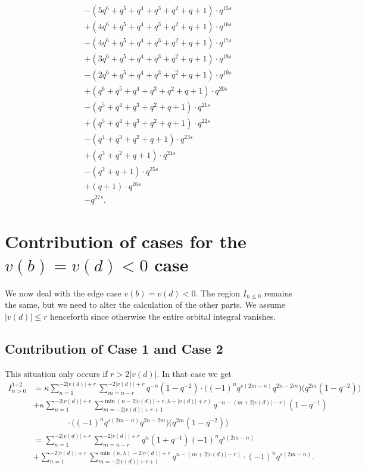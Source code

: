 \begin{example}
\begin{align*}
    &- (5q^6 + q^5 + q^4 + q^3 + q^2 + q + 1) \cdot q^{15s} \\
    &+ (4q^6 + q^5 + q^4 + q^3 + q^2 + q + 1) \cdot q^{16s} \\
    &- (4q^6 + q^5 + q^4 + q^3 + q^2 + q + 1) \cdot q^{17s} \\
    &+ (3q^6 + q^5 + q^4 + q^3 + q^2 + q + 1) \cdot q^{18s} \\
    &- (2q^6 + q^5 + q^4 + q^3 + q^2 + q + 1) \cdot q^{19s} \\
    &+ (q^6 + q^5 + q^4 + q^3 + q^2 + q + 1) \cdot q^{20s} \\
    &- (q^5 + q^4 + q^3 + q^2 + q + 1) \cdot q^{21s} \\
    &+ (q^5 + q^4 + q^3 + q^2 + q + 1) \cdot q^{22s} \\
    &- (q^4 + q^3 + q^2 + q + 1) \cdot q^{23s} \\
    &+ (q^3 + q^2 + q + 1) \cdot q^{24s} \\
    &- (q^2 + q + 1) \cdot q^{25s} \\
    &+ (q + 1) \cdot q^{26s} \\
    &- q^{27s}.
  \end{align*}
\end{example}

\section{Contribution of cases for the $v(b) = v(d) < 0$ case}
We now deal with the edge case $v(b) = v(d) < 0$.
The region $I_{n \le 0}$ remains the same, but we need to alter the calculation of the other parts.
We assume $|v(d)| \le r$ henceforth since otherwise the entire orbital integral vanishes.

\subsection{Contribution of Case 1 and Case 2}
This situation only occurs if $r > 2|v(d)|$.
In that case we get
\begin{align*}
  I_{n > 0}^{\text{1+2}}
  &= \kappa \sum_{n=1}^{-2|v(d)|+r}
    \sum_{m=n-r}^{-2|v(d)|+r}
    q^{-n} \left( 1 - q^{-2} \right)
    \cdot \Big( (-1)^n q^{s(2m-n)} q^{2n-2m} \Big) \Big( q^{2m}(1-q^{-2}) \Big) \\
  &+ \kappa \sum_{n=1}^{-2|v(d)|+r}
    \sum_{m=-2|v(d)|+r+1}^{\min\left(n-2|v(d)|+r, \lambda-|v(d)|+r\right)}
    q^{-n - (m+2|v(d)|-r)} \left( 1 - q^{-1} \right) \\
  &\qquad\qquad\cdot \Big( (-1)^n q^{s(2m-n)} q^{2n-2m} \Big) \Big( q^{2m}(1-q^{-2}) \Big) \\
  &= \sum_{n=1}^{-2|v(d)|+r} \sum_{m=n-r}^{-2|v(d)|+r}
    q^{n} \left( 1 + q^{-1} \right) (-1)^n q^{s(2m-n)} \\
  &+ \sum_{n=1}^{-2|v(d)|+r}
    \sum_{m=-2|v(d)|+r+1}^{\min\left(n,\lambda\right) - 2|v(d)| + r}
    q^{n - (m+2|v(d)|-r)} \cdot (-1)^n q^{s(2m-n)}.
\end{align*}


